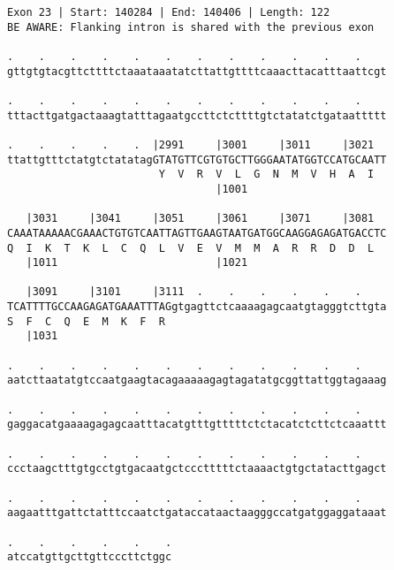 \documentclass{article}
\begin{document}
\begin{Verbatim}[fontfamily=courier]
Exon 23 | Start: 140284 | End: 140406 | Length: 122
BE AWARE: Flanking intron is shared with the previous exon

.    .    .    .    .    .    .    .    .    .    .    .    
gttgtgtacgttcttttctaaataaatatcttattgttttcaaacttacatttaattcgt

.    .    .    .    .    .    .    .    .    .    .    .    
tttacttgatgactaaagtatttagaatgccttctcttttgtctatatctgataattttt

.    .    .    .    .  |2991     |3001     |3011     |3021  
ttattgtttctatgtctatatagGTATGTTCGTGTGCTTGGGAATATGGTCCATGCAATT
                        Y  V  R  V  L  G  N  M  V  H  A  I  
                                 |1001                      

   |3031     |3041     |3051     |3061     |3071     |3081  
CAAATAAAAACGAAACTGTGTCAATTAGTTGAAGTAATGATGGCAAGGAGAGATGACCTC
Q  I  K  T  K  L  C  Q  L  V  E  V  M  M  A  R  R  D  D  L  
   |1011                         |1021                      

   |3091     |3101     |3111  .    .    .    .    .    .    
TCATTTTGCCAAGAGATGAAATTTAGgtgagttctcaaaagagcaatgtagggtcttgta
S  F  C  Q  E  M  K  F  R                                   
   |1031                                                    

.    .    .    .    .    .    .    .    .    .    .    .    
aatcttaatatgtccaatgaagtacagaaaaagagtagatatgcggttattggtagaaag

.    .    .    .    .    .    .    .    .    .    .    .    
gaggacatgaaaagagagcaatttacatgtttgtttttctctacatctcttctcaaattt

.    .    .    .    .    .    .    .    .    .    .    .    
ccctaagctttgtgcctgtgacaatgctccctttttctaaaactgtgctatacttgagct

.    .    .    .    .    .    .    .    .    .    .    .    
aagaatttgattctatttccaatctgataccataactaagggccatgatggaggataaat

.    .    .    .    .    .
atccatgttgcttgttcccttctggc
\end{Verbatim}
\newpage
\end{document}
